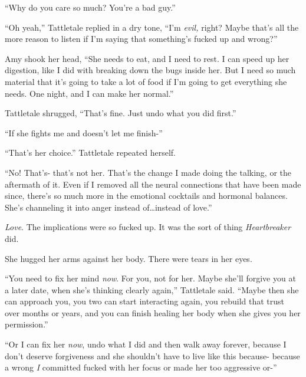 ``Why do you care so much?  You're a bad guy.''



``Oh yeah,'' Tattletale replied in a dry tone, ``I'm \emph{evil, }right?  Maybe that's all the more reason to listen if I'm saying that something's fucked up and wrong?''



Amy shook her head, ``She needs to eat, and I need to rest.  I can speed up her digestion, like I did with breaking down the bugs inside her.  But I need so much material that it's going to take a lot of food if I'm going to get everything she needs.  One night, and I can make her normal.''



Tattletale shrugged, ``That's fine.  Just undo what you did first.''



``If she fights me and doesn't let me finish-''



``That's her choice.''  Tattletale repeated herself.



``No!  That's- that's not her.  That's the change I made doing the talking, or the aftermath of it.  Even if I removed all the neural connections that have been made since, there's so much more in the emotional cocktails and hormonal balances.  She's channeling it into anger instead of\ldots instead of love.''



\emph{Love}.  The implications were so fucked up.  It was the sort of thing \emph{Heartbreaker }did.



She hugged her arms against her body.  There were tears in her eyes.



``You need to fix her mind \emph{now}.  For you, not for her.  Maybe she'll forgive you at a later date, when she's thinking clearly again,'' Tattletale said.  ``Maybe then she can approach you, you two can start interacting again, you rebuild that trust over months or years, and you can finish healing her body when she gives you her permission.''



``Or I can fix her \emph{now}, undo what I did and then walk away forever, because I don't deserve forgiveness and she shouldn't have to live like this because- because a wrong \emph{I} committed fucked with her focus or made her too aggressive or-''



